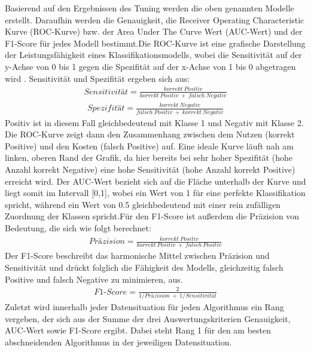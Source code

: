 \documentclass[
]{article}
\begin{document}
Basierend auf den Ergebnissen des Tuning werden die oben genannten
Modelle erstellt. Daraufhin werden die Genauigkeit, die Receiver
Operating Characteristic Kurve (ROC-Kurve) bzw. der Area Under The Curve
Wert (AUC-Wert) und der F1-Score für jedes Modell bestimmt.\newline Die
ROC-Kurve ist eine grafische Darstellung der Leistungsfähigkeit eines
Klassifikationsmodells, wobei die Sensitivität auf der y-Achse von 0 bis
1 gegen die Spezifität auf der x-Achse von 1 bis 0 abgetragen wird
\parencite{fawcettIntroductionROCAnalysis2006}. Sensitivität und
Spezifität ergeben sich aus: \begin{align}
Sensitivität=\frac{korrekt~Positiv}{korrekt~Positiv~+~falsch~Negativ}
\end{align} \begin{align}
Spezifität=\frac{korrekt~Negativ}{falsch~Positiv~+~korrekt~Negativ}
\end{align} Positiv ist in diesem Fall gleichbedeutend mit Klasse 1 und
Negativ mit Klasse 2. Die ROC-Kurve zeigt dann den Zusammenhang zwischen
dem Nutzen (korrekt Positive) und den Kosten (falsch Positive) auf. Eine
ideale Kurve läuft nah am linken, oberen Rand der Grafik, da hier
bereits bei sehr hoher Spezifität (hohe Anzahl korrekt Negative) eine
hohe Sensitivität (hohe Anzahl korrekt Positive) erreicht wird. Der
AUC-Wert bezieht sich auf die Fläche unterhalb der Kurve und liegt somit
im Intervall {[}0,1{]}, wobei ein Wert von 1 für eine perfekte
Klassifikation spricht, während ein Wert von 0.5 gleichbedeutend mit
einer rein zufälligen Zuordnung der Klassen spricht.\newline Für den
F1-Score ist außerdem die Präzision von Bedeutung, die sich wie folgt
berechnet\parencite{fawcettIntroductionROCAnalysis2006}: \begin{align}
Präzision=\frac{korrekt~Positiv}{korrekt~Positiv~+~falsch~Positiv}
\end{align} Der F1-Score beschreibt das harmonische Mittel zwischen
Präzision und Sensitivität und drückt folglich die Fähigkeit des
Modells, gleichzeitig falsch Positive und falsch Negative zu minimieren,
aus. \begin{align}
F1\text{-}Score=\frac{2}{1/Präzision~+~1/Sensitivität}
\end{align}\newline Zuletzt wird innerhalb jeder Datensituation für
jeden Algorithmus ein Rang vergeben, der sich aus der Summe der drei
Auswertungskriterien Genauigkeit, AUC-Wert sowie F1-Score ergibt. Dabei
steht Rang 1 für den am besten abschneidenden Algorithmus in der
jeweiligen Datensituation.
\end{document}
